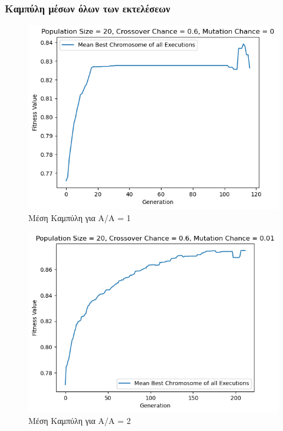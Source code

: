 \documentclass[12pt,a4paper]{article}
\begin{document}
\subsubsection{Καμπύλη μέσων όλων των εκτελέσεων}
\begin{figure}[H]
	\includegraphics[width=\textwidth]{Figures/1. Means for AA = 1.png}
	\caption{Μέση Καμπύλη για A/A = 1}
\end{figure}

\begin{figure}[H]
	\includegraphics[width=\textwidth]{Figures/3. Means for AA = 2.png}
	\caption{Μέση Καμπύλη για A/A = 2}
\end{figure}
\end{document}
